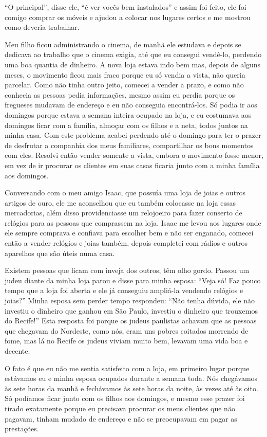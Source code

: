 ``O principal'', disse ele, ``é ver vocês bem instalados'' e assim foi
feito, ele foi comigo comprar os móveis e ajudou a colocar nos lugares
certos e me mostrou como deveria trabalhar.

Meu filho ficou administrando o cinema, de manhã ele estudava e depois
se dedicava ao trabalho que o cinema exigia, até que eu consegui
vendê-lo, perdendo uma boa quantia de dinheiro. A nova loja estava indo
bem mas, depois de alguns meses, o movimento ficou mais fraco porque eu
só vendia a vista, não queria parcelar. Como não tinha outro jeito,
comecei a vender a prazo, e como não conhecia as pessoas pedia
informações, mesmo assim eu perdia porque os fregueses mudavam de
endereço e eu não conseguia encontrá-los. Só podia ir aos domingos
porque estava a semana inteira ocupado na loja, e eu costumava aos
domingos ficar com a família, almoçar com os filhos e a neta, todos
juntos na minha casa. Com este problema acabei perdendo até o domingo
para ter o prazer de desfrutar a companhia dos meus familiares,
compartilhar os bons momentos com eles. Resolvi então vender somente a
vista, embora o movimento fosse menor, em vez de ir procurar os clientes
em suas casas ficaria junto com a minha família aos domingos.

Conversando com o meu amigo Isaac, que possuía uma loja de joias e
outros artigos de ouro, ele me aconselhou que eu também colocasse na
loja essas mercadorias, além disso providenciasse um relojoeiro para
fazer conserto de relógios para as pessoas que comprassem na loja. Isaac
me levou aos lugares onde ele sempre comprava e confiava para escolher
bem e não ser enganado, comecei então a vender relógios e joias também,
depois completei com rádios e outros aparelhos que são úteis numa casa.

Existem pessoas que ficam com inveja dos outros, têm olho gordo. Passou
um judeu diante da minha loja parou e disse para minha esposa: ``Veja
só! Faz pouco tempo que a loja foi aberta e ele já conseguiu ampliá-la
vendendo relógios e joias?'' Minha esposa sem perder tempo respondeu:
``Não tenha dúvida, ele não investiu o dinheiro que ganhou em São Paulo,
investiu o dinheiro que trouxemos do Recife!'' Esta resposta foi porque
os judeus paulistas achavam que as pessoas que chegavam do Nordeste,
como nós, eram uns pobres coitados morrendo de fome, mas lá no Recife os
judeus viviam muito bem, levavam uma vida boa e decente.

O fato é que eu não me sentia satisfeito com a loja, em primeiro lugar
porque estávamos eu e minha esposa ocupados durante a semana toda. Nós
chegávamos às sete horas da manhã e fechávamos às sete horas da noite,
às vezes até às oito. Só podíamos ficar junto com os filhos aos
domingos, e mesmo esse prazer foi tirado exatamente porque eu precisava
procurar os meus clientes que não pagavam, tinham mudado de endereço e
não se preocupavam em pagar as prestações.

